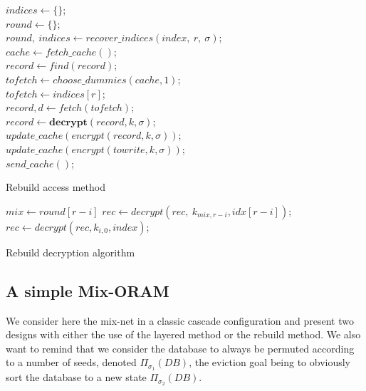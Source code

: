 \documentclass[USenglish,oneside,twocolumn]{article}
\begin{document}
\begin{algorithm}
\DontPrintSemicolon
{}
$indices \gets \{\}$;\\
$round\gets \{\}$;\\
{
$round,\ indices \gets recover\_indices(index,\ r,\ \sigma)$;\\
}
$cache \gets fetch\_cache()$;\\
{
$record \gets find(record)$;\\
$tofetch \gets choose\_dummies(cache, 1)$;\\
}
\Else
{
$tofetch \gets indices[r]$;\\
}
$record, d \gets fetch(tofetch)$;\\
$record \gets \textbf{decrypt}(record,k,\sigma)$;\\
{
$update\_cache(encrypt(record,k,\sigma))$;\\
}
\Else
{
$update\_cache(encrypt(towrite,k,\sigma))$;\\
}
$send\_cache()$;\\
\caption{Rebuild access method}
\label{alg:racc}
\end{algorithm}

\begin{algorithm}
\DontPrintSemicolon
{}
{
$mix \gets round[r-i]$
$rec \gets decrypt(rec,\ k_{mix,r-i}, idx[r-i] )$;\\
}
{
$rec \gets decrypt(rec, k_{i,0}, index )$;\\
}
\caption{Rebuild decryption algorithm}
\label{alg:rdec}
\end{algorithm}
%
\subsection{A simple Mix-ORAM}\label{SMO}
%
We consider here the mix-net in a classic cascade configuration and present two designs with either the use of the layered method or the rebuild method. We also want to remind that we consider the database to always be permuted according to a number of seeds, denoted $\Pi_{\sigma_1}(DB)$, the eviction goal being to obviously sort the database to a new state $\Pi_{\sigma_2}(DB)$.\\
\end{document}

